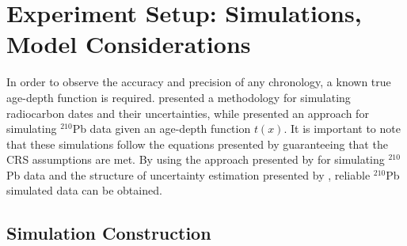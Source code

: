 \documentclass [10pt] {article}
\begin{document}
\section{Experiment Setup: Simulations, Model Considerations}

	In order to observe the accuracy and precision of any chronology, a known true age-depth function is required.
\citet{Blaauw2018} presented a methodology for simulating radiocarbon dates and their uncertainties, while \citet{Aquino2018} presented an approach for simulating $^{210}$Pb data given an age-depth function $t(x)$.
It is important to note that these simulations follow the equations presented by \cite{Appleby1978, Robbins1978} guaranteeing that the CRS assumptions are met. 
By using the approach presented by \citet{Aquino2018} for simulating $^{210}$Pb data and the structure of uncertainty estimation presented by \citet{Blaauw2018}, reliable $^{210}$Pb simulated data can be obtained.

\subsection{Simulation Construction}\label{sec:SimConst}
\end{document}
